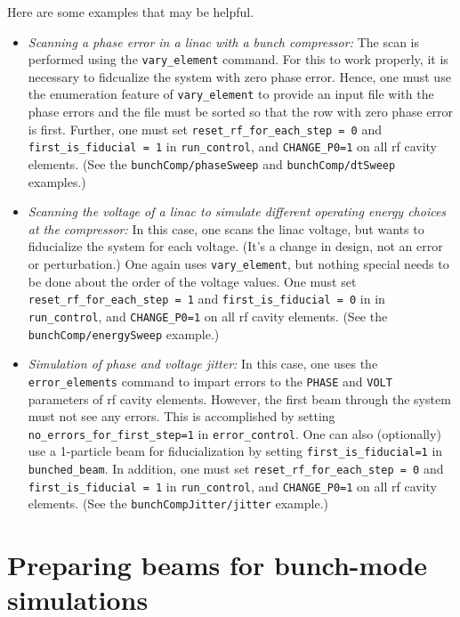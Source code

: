 \documentclass[11pt]{article}
\begin{document}
Here are some examples that may be helpful.  
\begin{itemize}
\item {\em Scanning a phase error in a linac with a bunch compressor:}  The scan is performed using
the \verb|vary_element| command.  For this to work properly, it is necessary to fidcualize the system
with zero phase error.  Hence, one must use the enumeration feature of \verb|vary_element| to provide
an input file with the phase errors and the file must be sorted so that the row with zero phase error
is first.  Further, one must set \verb|reset_rf_for_each_step = 0| and \verb|first_is_fiducial = 1|
in \verb|run_control|, and \verb|CHANGE_P0=1| on all rf cavity elements.  (See the \verb|bunchComp/phaseSweep| 
and \verb|bunchComp/dtSweep| examples.)

\item {\em Scanning the voltage of a linac to simulate different operating energy choices at the compressor:}
In this case, one scans the linac voltage, but wants to fiducialize the system for each voltage.
(It's a change in design, not an error or perturbation.)  One again uses \verb|vary_element|, but
nothing special needs to be done about the order of the voltage values.  One must set
\verb|reset_rf_for_each_step = 1| and \verb|first_is_fiducial = 0| in in \verb|run_control|,
and \verb|CHANGE_P0=1| on all rf cavity elements.  (See the \verb|bunchComp/energySweep| example.)

\item {\em Simulation of phase and voltage jitter:}  In this case, one uses the \verb|error_elements|
command to impart errors to the \verb|PHASE| and \verb|VOLT| parameters of rf cavity elements.
However, the first beam through the system must not see any errors.  This is accomplished by
setting \verb|no_errors_for_first_step=1| in \verb|error_control|.  One can also (optionally) use
a 1-particle beam for fiducialization by setting \verb|first_is_fiducial=1| in \verb|bunched_beam|.
In addition, one must set  \verb|reset_rf_for_each_step = 0| and \verb|first_is_fiducial = 1|
in \verb|run_control|, and \verb|CHANGE_P0=1| on all rf cavity elements.  (See the \verb|bunchCompJitter/jitter|
example.)

\end{itemize}

\section{Preparing beams for bunch-mode simulations}\label{sect:bunchedBeams}
\end{document}
